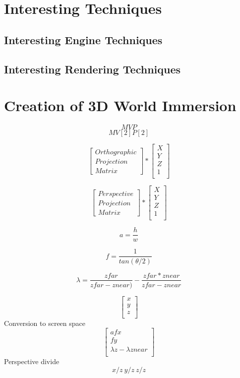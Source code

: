 \newpage
\section{Interesting Techniques} %

\newpage
\subsection{Interesting Engine Techniques}

\newpage
\subsection{Interesting Rendering Techniques}

\newpage
\section{Creation of 3D World Immersion}
\[MVP\]
\[MV[2]P[2]\]

\[
\begin{bmatrix}
Orthographic\\
Projection \\
Matrix
\end{bmatrix} 
*
\begin{bmatrix}
X\\
Y\\
Z\\
1\\
\end{bmatrix} 
\]

\[
\begin{bmatrix}
Perspective\\
Projection \\
Matrix
\end{bmatrix} 
*
\begin{bmatrix}
X\\
Y\\
Z\\
1\\
\end{bmatrix} 
\]

\[
a=\frac{h}{w}
\]

\[
f=\frac{1}{tan(\theta / 2)}
\]

\[
\lambda=\frac{zfar}{zfar - znear)}
-
\frac{zfar * znear}{zfar-znear}
\]

\[
\begin{bmatrix}
x\\
y\\
z\\
\end{bmatrix}
\]
Conversion to screen space
\[
\begin{bmatrix}
afx\\
fy\\
\lambda z-\lambda znear\\
\end{bmatrix}
\]
Perspective divide
\[
x/z\ y/z\ z/z
\]

